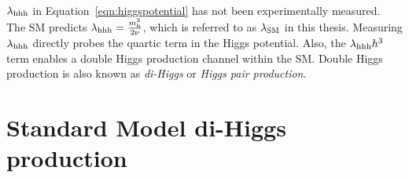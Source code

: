 \paragraph{}
$\lambda_{\rm hhh}$ in Equation~\ref{eqn:higgspotential} has not been experimentally measured. 
The SM predicts $\lambda_{\rm hhh} = \frac{m_{\rm h}^2}{2\rm\nu}$, which is referred to as \textbf{$\lambda_{\rm SM}$} in this thesis. 
Measuring $\lambda_{\rm hhh}$ directly probes the quartic term in the Higgs potential.
Also, the $\lambda_{\rm hhh}h^3$ term enables a double Higgs production channel within the SM. 
Double Higgs production is also known as \textit{di-Higgs} or \textit{Higgs pair production}.



\section{Standard Model di-Higgs production}



